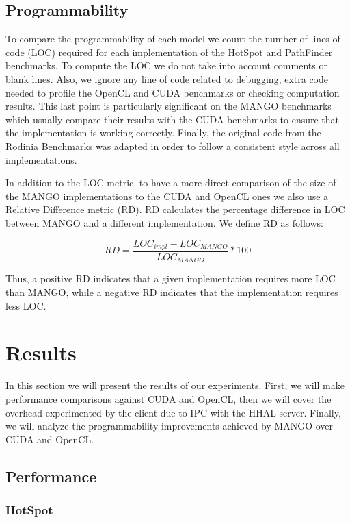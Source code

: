 \subsection{Programmability}

To compare the programmability of each model we count the number of lines of code (LOC) required for each implementation of the HotSpot and PathFinder benchmarks. To compute the LOC we do not take into account comments or blank lines. Also, we ignore any line of code related to debugging, extra code needed to profile the OpenCL and CUDA benchmarks or checking computation results. This last point is particularly significant on the MANGO benchmarks which usually compare their results with the CUDA benchmarks to ensure that the implementation is working correctly. Finally, the original code from the Rodinia Benchmarks was adapted in order to follow a consistent style across all implementations. 

In addition to the LOC metric, to have a more direct comparison of the size of the MANGO implementations to the CUDA and OpenCL ones we also use a Relative Difference metric (RD). RD calculates the percentage difference in LOC between MANGO and a different implementation. We define RD as follows:

\[
    RD = \frac{LOC_{impl} - LOC_{MANGO}}{LOC_{MANGO}} * 100
\]

Thus, a positive RD indicates that a given implementation requires more LOC than MANGO, while a negative RD indicates that the implementation requires less LOC.

\section{Results}

In this section we will present the results of our experiments. First, we will make performance comparisons against CUDA and OpenCL, then we will cover the overhead experimented by the client due to IPC with the HHAL server. Finally, we will analyze the programmability improvements achieved by MANGO over CUDA and OpenCL.

\subsection{Performance}

\subsubsection{HotSpot}

